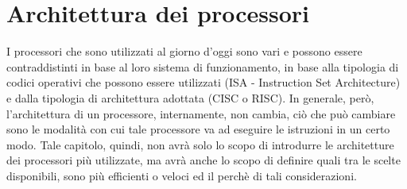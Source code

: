 \chapter{Architettura dei processori}
I processori che sono utilizzati al giorno d'oggi sono vari e possono essere contraddistinti in base al loro sistema di funzionamento, in base alla tipologia di codici operativi che possono essere utilizzati (ISA - Instruction Set Architecture) e dalla tipologia di architettura adottata (CISC o RISC). 
In generale, però, l'architettura di un processore, internamente, non cambia, ciò che può cambiare sono le modalità con cui tale processore va ad eseguire le istruzioni in un certo modo. Tale capitolo, quindi, non avrà solo lo scopo di introdurre le architetture dei processori più utilizzate, ma avrà anche lo scopo di definire quali tra le scelte disponibili, sono più efficienti o veloci ed il perchè di tali considerazioni.







